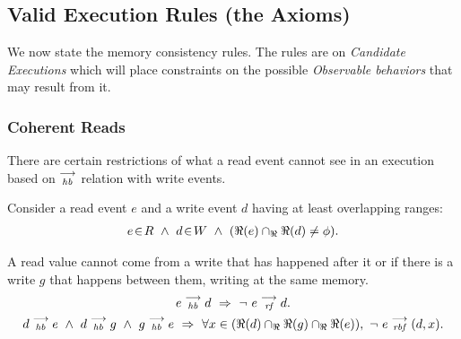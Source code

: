 
    \subsection{Valid Execution Rules (the Axioms)}
        We now state the memory consistency rules. The rules are on \textit{Candidate Executions} which will place constraints on the possible \textit{Observable behaviors} that may result from it.
         
        \subsubsection{Coherent Reads} 
        
            There are certain restrictions of what a read event cannot see in an execution based on $\stackrel{\longrightarrow}{_\textit{hb}}$ relation with write events.
            
            Consider a read event $e$ and a write event $d$ having at least overlapping ranges:
            \begin{align*}
                \event{e}{R} \ \wedge \ 
                \event{d}{W} \ \wedge \
                (\Re(e) \cap_\Re \Re(d) \neq \phi).
            \end{align*}
            
            A read value cannot come from a write that has happened after it or if there is a write $g$ that happens between them, writing at the same memory.     
                \begin{gather*}
                    \reln{e}{hb}{d}\ \Rightarrow{}\ \neg \ \reln{e}{rf}{d}. \\
                    \reln{d}{hb}{e}
                    \ \wedge \ 
                    \reln{d}{hb}{g} \ \wedge \  \reln{g}{hb}{e}
                    \ \Rightarrow{} \
                    \forall x \in (\Re(d) \cap_\Re \Re(g) \cap_\Re \Re(e)), \ \neg \ \reln{e}{rbf}{(d,x)}.
                \end{gather*}
     
